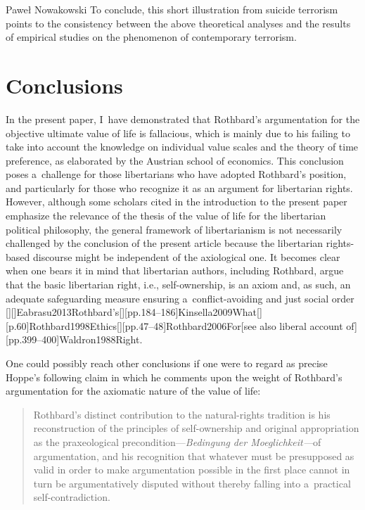 \begin{artengenv}{Paweł Nowakowski}
To conclude, this short illustration from suicide terrorism points to the consistency between the above theoretical analyses and the results of empirical studies on the phenomenon of contemporary terrorism.



\section{Conclusions}

In the present paper, I~have demonstrated that Rothbard's argumentation for the objective ultimate value of life is fallacious, which is mainly due to his failing to take into account the knowledge on individual value scales and the theory of time preference, as elaborated by the Austrian school of economics. This conclusion poses a~challenge for those libertarians who have adopted Rothbard's position, and particularly for those who recognize it as an argument for libertarian rights. However, although some scholars cited in the introduction to the present paper emphasize the relevance of the thesis of the value of life for the libertarian political philosophy, the general framework of libertarianism is not necessarily challenged by the conclusion of the present article because the libertarian rights-based discourse might be independent of the axiological one. It becomes clear when one bears it in mind that libertarian authors, including Rothbard, argue that the basic libertarian right, i.e., self-ownership, is an axiom and, as such, an adequate safeguarding measure ensuring a~conflict-avoiding and just social order 
\parencites[see, e.g.,][p.736]{Child1994Can}[][]{Eabrasu2013Rothbard’s}[][pp.184–186]{Kinsella2009What}[][p.60]{Rothbard1998Ethics}[][pp.47–48]{Rothbard2006For}[see also liberal account of][pp.399–400]{Waldron1988Right}.%




One could possibly reach other conclusions if one were to regard as precise Hoppe's 
\parencite*[][p.xxxiv]{Hoppe1998Introduction} %
 following claim in which he comments upon the weight of Rothbard's argumentation for the axiomatic nature of the value of life:



\begin{quote}
Rothbard's distinct contribution to the natural-rights tradition is his reconstruction of the principles of self-ownership and original appropriation as the praxeological precondition---\textit{Bedingung} \textit{der Moeglichkeit---}of argumentation, and his recognition that whatever must be presupposed as valid in order to make argumentation possible in the first place cannot in turn be argumentatively disputed without thereby falling into a~practical self-contradiction.
\end{quote}




\end{artengenv}
